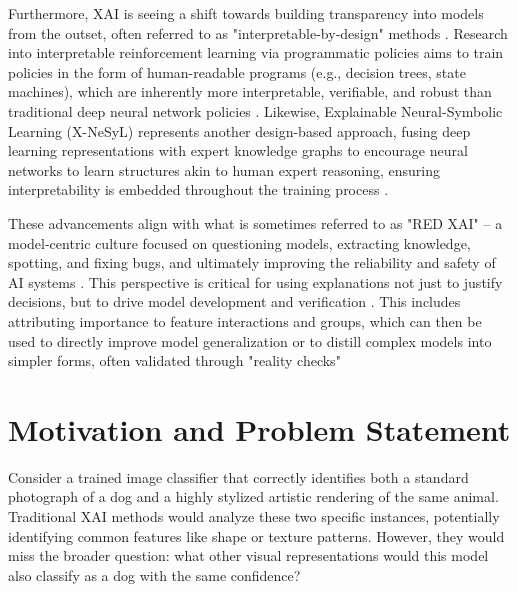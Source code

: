 Furthermore, XAI is seeing a shift towards building transparency into models from the outset, often referred to as "interpretable-by-design" methods \citep{Karimi2022, Holzinger2022a}. Research into interpretable reinforcement learning via programmatic policies aims to train policies in the form of human-readable programs (e.g., decision trees, state machines), which are inherently more interpretable, verifiable, and robust than traditional deep neural network policies \citep{inbook, Inala2020Synthesizing, verma2019programmaticallyinterpretablereinforcementlearning}. Likewise, Explainable Neural-Symbolic Learning (X-NeSyL) represents another design-based approach, fusing deep learning representations with expert knowledge graphs to encourage neural networks to learn structures akin to human expert reasoning, ensuring interpretability is embedded throughout the training process \citep{D_az_Rodr_guez_2022, karimi2020algorithmicrecoursecounterfactualexplanations}.

These advancements align with what is sometimes referred to as "RED XAI" – a model-centric culture focused on questioning models, extracting knowledge, spotting, and fixing bugs, and ultimately improving the reliability and safety of AI systems \citep{10.5555/3692070.3692231}. This perspective is critical for using explanations not just to justify decisions, but to drive model development and verification \citep{Tsai2022}. This includes attributing importance to feature interactions and groups, which can then be used to directly improve model generalization or to distill complex models into simpler forms, often validated through "reality checks" \citep{Singh2022}
\section{Motivation and Problem Statement}

Consider a trained image classifier that correctly identifies both a standard photograph of a dog and a highly stylized artistic rendering of the same animal. Traditional XAI methods would analyze these two specific instances, potentially identifying common features like shape or texture patterns. However, they would miss the broader question: what other visual representations would this model also classify as a dog with the same confidence?

